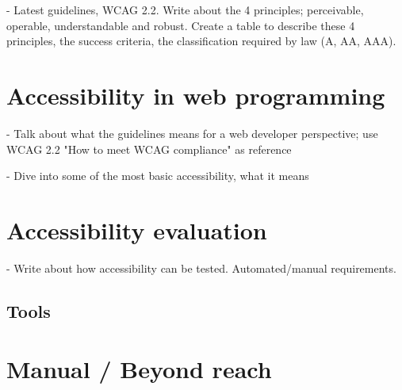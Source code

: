 - Latest guidelines, WCAG 2.2. Write about the 4 principles; perceivable, operable, understandable and robust. Create a table to describe these 4 principles, the success criteria, the classification required by law (A, AA, AAA).

\section{Accessibility in web programming}

- Talk about what the guidelines means for a web developer perspective; use WCAG 2.2 "How to meet WCAG compliance" as reference

- Dive into some of the most basic accessibility, what it means
\section{Accessibility evaluation}

- Write about how accessibility can be tested. Automated/manual requirements.

\subsection{Tools}

\section{Manual / Beyond reach}